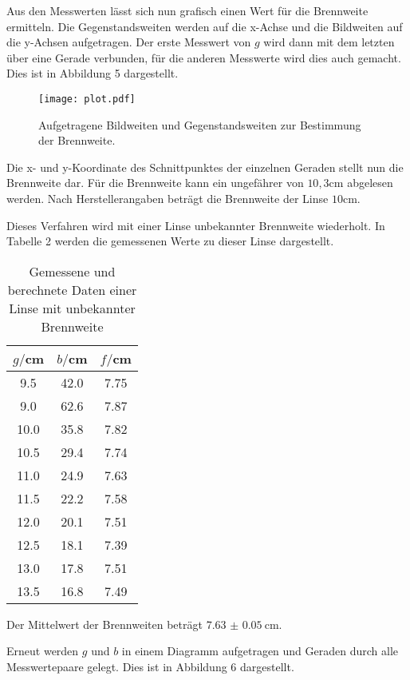 Aus den Messwerten lässt sich nun grafisch einen Wert für die Brennweite ermitteln. Die Gegenstandsweiten
werden auf die x-Achse und die Bildweiten auf die y-Achsen aufgetragen. Der erste Messwert von $g$ wird dann mit
dem letzten über eine Gerade verbunden, für die anderen Messwerte wird dies auch gemacht. Dies ist in
Abbildung 5 dargestellt.




\begin{figure}[H]
  \centering
  \texttt{[image: plot.pdf]}
  \caption{Aufgetragene Bildweiten und Gegenstandsweiten zur Bestimmung der Brennweite.}
  \label{fig:plot}
\end{figure}


Die x- und y-Koordinate des Schnittpunktes der einzelnen Geraden stellt nun die Brennweite dar. Für die Brennweite kann
ein ungefährer von $10,3$cm abgelesen werden. Nach Herstellerangaben beträgt die Brennweite der Linse $10$cm.



Dieses Verfahren wird mit einer Linse unbekannter Brennweite wiederholt. In Tabelle 2 werden
die gemessenen Werte zu dieser Linse dargestellt.

\begin{table}[H]
  \centering
  \caption{Gemessene und berechnete Daten einer Linse mit unbekannter Brennweite}
  \label{tab:Widerstand}
  \begin{tabular}{c c c}
    \toprule
    $g/$cm  & $b/$cm & $f/$cm \\
    \midrule
    9.5     &     42.0 & 7.75 \\
    9.0     &     62.6 & 7.87 \\
    10.0    &     35.8 & 7.82 \\
    10.5    &     29.4 & 7.74 \\
    11.0    &     24.9 & 7.63 \\
    11.5    &     22.2 & 7.58 \\
    12.0    &     20.1 & 7.51 \\
    12.5    &     18.1 & 7.39 \\
    13.0    &     17.8 & 7.51 \\
    13.5    &     16.8 & 7.49 \\
    \bottomrule
  \end{tabular}
\end{table}

Der Mittelwert der Brennweiten beträgt $\SI{7.63(5)}{\centi\meter}$.

Erneut werden $g$ und $b$ in einem Diagramm aufgetragen und Geraden durch alle Messwertepaare gelegt. Dies ist in Abbildung 6
dargestellt.

